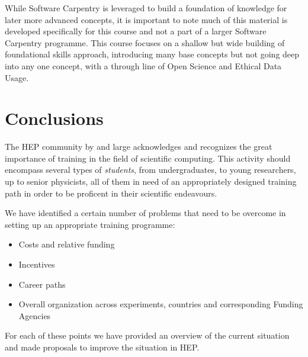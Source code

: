 \documentclass[12pt,a4paper]{article}
\begin{document}
While Software Carpentry is leveraged to build a foundation of knowledge for
later more advanced concepts, it is important to note much of this material is
developed specifically for this course and not a part of a larger Software
Carpentry programme. This course focuses on a shallow but wide building of
foundational skills approach, introducing many base concepts but not going deep
into any one concept, with a through line of Open Science and Ethical Data
Usage.

\section{Conclusions}

The HEP community by and large acknowledges and recognizes the great importance
of training in the field of scientific computing. This activity should encompass
several types of {\it students}, from undergraduates, to young researchers, up
to senior physicists, all of them in need of an appropriately designed training
path in order to be proficent in their scientific endeavours.

We have identified a certain number of problems that need to be overcome in
setting up an appropriate training programme:
\begin{itemize}
    \item Costs and relative funding
    \item Incentives
    \item Career paths
    \item Overall organization across experiments, countries and 
    corresponding Funding Agencies
\end{itemize}

For each of these points we have provided an overview of the current situation
and made proposals to improve the situation in HEP.

\end{document}
